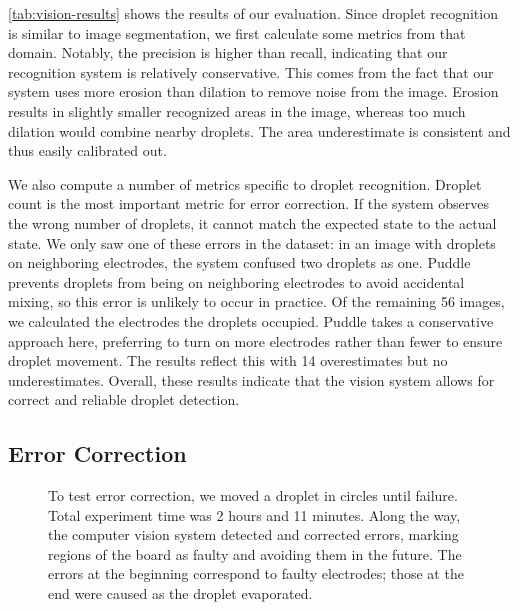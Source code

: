 \documentclass{jpaper}
\begin{document}
\autoref{tab:vision-results} shows the results of our evaluation.
Since droplet recognition is similar to image segmentation, we first calculate some metrics from that domain.
Notably, the precision is higher than recall, indicating that our recognition system is relatively conservative.
This comes from the fact that our system uses more erosion than dilation to remove noise from the image.
Erosion results in slightly smaller recognized areas in the image, whereas too much dilation would combine nearby droplets.
The area underestimate is consistent and thus easily calibrated out.

We also compute a number of metrics specific to droplet recognition.
Droplet count is the most important metric for error correction.
If the system observes the wrong number of droplets, it cannot match the expected state to the actual state.
We only saw one of these errors in the dataset: in an image with droplets on neighboring electrodes, the system confused two droplets as one.
Puddle prevents droplets from being on neighboring electrodes to avoid accidental mixing, so this error is unlikely to occur in practice.
Of the remaining 56 images, we calculated the electrodes the droplets occupied.
Puddle takes a conservative approach here, preferring to turn on more electrodes rather than fewer to ensure droplet movement.
The results reflect this with 14 overestimates but no underestimates.
Overall, these results indicate that the vision system allows for correct and reliable droplet detection.

\subsection{Error Correction}
\label{sec:endurance}

\begin{figure}
  \centering
  \caption{
    To test error correction, we moved a droplet in circles until failure.
    Total experiment time was 2 hours and 11 minutes.
    Along the way, the computer vision system detected and corrected errors, marking regions of the board as faulty and avoiding them in the future.
    The errors at the beginning correspond to faulty electrodes; those at the end were caused as the droplet evaporated.
  }
  \label{fig:endurance}
\end{figure}
\end{document}
